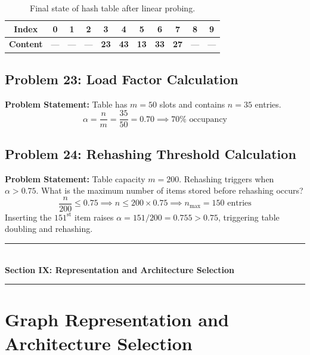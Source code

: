 \begin{table}[htbp]
\centering
\small
\begin{tabular}{c c c c c c c c c c c}
\toprule
\textbf{Index} & 0 & 1 & 2 & 3 & 4 & 5 & 6 & 7 & 8 & 9 \\
\midrule
\textbf{Content} & --- & --- & --- & \textbf{23} & \textbf{43} & \textbf{13} & \textbf{33} & \textbf{27} & --- & --- \\
\bottomrule
\end{tabular}
\caption{Final state of hash table after linear probing.}
\end{table}

\subsection{Problem 23: Load Factor Calculation}

\textbf{Problem Statement:} Table has $m = 50$ slots and contains $n = 35$ entries.
\[
\alpha = \frac{n}{m} = \frac{35}{50} = 0.70 \implies \boxed{70\% \text{ occupancy}}
\]

\subsection{Problem 24: Rehashing Threshold Calculation}

\textbf{Problem Statement:} Table capacity $m = 200$. Rehashing triggers when $\alpha > 0.75$. What is the maximum number of items stored before rehashing occurs?
\[
\frac{n}{200} \leq 0.75 \implies n \leq 200 \times 0.75 \implies \boxed{n_{\max} = 150 \text{ entries}}
\]
Inserting the $151^{\text{st}}$ item raises $\alpha = 151/200 = 0.755 > 0.75$, triggering table doubling and rehashing.

\newpage
\begin{center}
\vspace{0.5em}
{\color{primary}\rule{0.45\textwidth}{1.2pt}}\\[4pt]
{\Large\bfseries\color{primary} Section IX: Representation and Architecture Selection}\\[2pt]
{\color{primary}\rule{0.45\textwidth}{1.2pt}}
\vspace{0.5em}
\end{center}

\section{Graph Representation and Architecture Selection}


